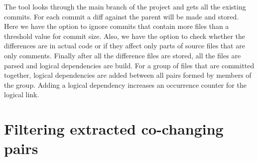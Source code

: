\documentclass[12pt]{mitthesis}
\begin{document}
The tool looks through the main branch of the project and gets all the existing commits. For each commit a diff against the parent will be made and stored. Here we have the option to ignore commits that contain more files than a threshold value for commit size. Also, we have the option to check whether the differences are in actual code or if they affect only parts of source files that are only comments.  Finally after all the difference files are stored, all the files are parsed and logical dependencies are build. For a group of files that are committed together, logical dependencies are added between all pairs formed by members of the group. Adding a logical dependency increases an occurrence counter for the logical link. \\





\chapter {Filtering extracted co-changing pairs}
\end{document}
